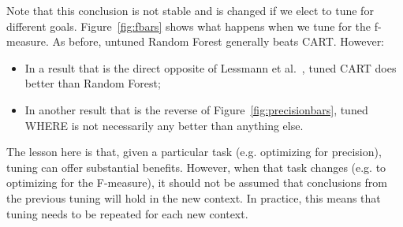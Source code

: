 \documentclass{sig-alternative}
\newcommand{\bi}{\begin{itemize}[leftmargin=0.4cm]}
\newcommand{\ei}{\end{itemize}}
\newcommand{\fig}[1]{Figure~\ref{fig:#1}}
\begin{document}
Note that this conclusion is not stable and is changed if we elect to tune for different goals. 
\fig{fbars} shows what happens when we tune for the f-measure. 
As before, untuned Random Forest generally beats CART. However:
\bi
\item
In  a result that is the direct opposite of   
 Lessmann et al.~\cite{lessmann2008benchmarking}, tuned CART does better than Random Forest;
 \item 
 In another result that is the reverse of \fig{precisionbars}, tuned WHERE is not necessarily
 any better than anything else.
 \ei
The lesson here is that, given a particular task (e.g. optimizing for precision), tuning can offer
substantial benefits. However, when that task changes (e.g. to optimizing for the F-measure),
it should not be assumed that conclusions from the previous tuning will hold in the new context.
In practice, this means that tuning needs to be repeated for each new context.
\end{document}
